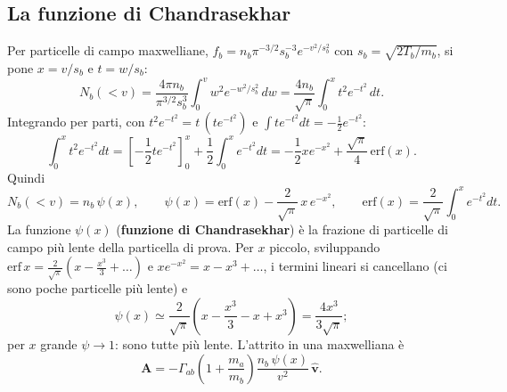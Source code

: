 \subsection{La funzione di Chandrasekhar}
Per particelle di campo maxwelliane, $f_b=n_b\pi^{-3/2}s_b^{-3}e^{-v^2/s_b^2}$ con $s_b=\sqrt{2T_b/m_b}$, si pone $x=v/s_b$ e $t=w/s_b$:
\begin{equation}
N_b(<v)=\frac{4\pi n_b}{\pi^{3/2}s_b^3}\int_0^vw^2e^{-w^2/s_b^2}\,dw=\frac{4n_b}{\sqrt\pi}\int_0^xt^2e^{-t^2}\,dt.
\end{equation}
Integrando per parti, con $t^2e^{-t^2}=t\,(te^{-t^2})$ e $\int te^{-t^2}dt=-\tfrac12e^{-t^2}$:
\begin{equation}
\int_0^xt^2e^{-t^2}dt=\left[-\frac12te^{-t^2}\right]_0^x+\frac12\int_0^xe^{-t^2}dt=-\frac12xe^{-x^2}+\frac{\sqrt\pi}{4}\,\mathrm{erf}(x).
\end{equation}
Quindi
\begin{equation}
N_b(<v)=n_b\,\psi(x),\qquad\psi(x)=\mathrm{erf}(x)-\frac{2}{\sqrt\pi}\,x\,e^{-x^2},\qquad\mathrm{erf}(x)=\frac{2}{\sqrt\pi}\int_0^xe^{-t^2}dt.
\end{equation}
La funzione $\psi(x)$ (\textbf{funzione di Chandrasekhar}) è la frazione di particelle di campo più lente della particella di prova. Per $x$ piccolo, sviluppando $\mathrm{erf}\,x=\frac{2}{\sqrt\pi}\left(x-\frac{x^3}{3}+\dots\right)$ e $xe^{-x^2}=x-x^3+\dots$, i termini lineari si cancellano (ci sono poche particelle più lente) e
\begin{equation}
\psi(x)\simeq\frac{2}{\sqrt\pi}\left(x-\frac{x^3}{3}-x+x^3\right)=\frac{4x^3}{3\sqrt\pi};
\end{equation}
per $x$ grande $\psi\to1$: sono tutte più lente. L'attrito in una maxwelliana è
\begin{equation}
\mathbf{A}=-\Gamma_{ab}\left(1+\frac{m_a}{m_b}\right)\frac{n_b\,\psi(x)}{v^2}\,\hat{\mathbf{v}}.
\end{equation}

